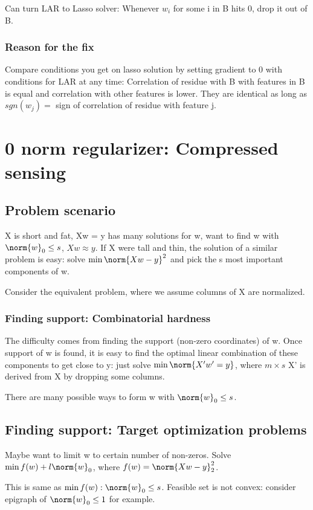 \documentclass[oneside, article]{memoir}
\begin{document}
Can turn LAR to Lasso solver: Whenever $w_{i}$ for some i in B hits 0, drop it out of B.

\subsubsection{Reason for the fix}
Compare conditions you get on lasso solution by setting gradient to 0 with conditions for LAR at any time: Correlation of residue with B with features in B is equal and correlation with other features is lower. They are identical as long as $sgn(w_j) = $ sign of correlation of residue with feature j.

\section{0 norm regularizer: Compressed sensing}
\subsection{Problem scenario}
X is short and fat, Xw = y has many solutions for w, want to find w with $\norm{w}_0\leq s$, $Xw \approx y$. If X were tall and thin, the solution of a similar problem is easy: solve $\min \norm{Xw - y}^{2}$ and pick the s most important components of w.

Consider the equivalent problem, where we assume columns of X are normalized.

\subsubsection{Finding support: Combinatorial hardness}
The difficulty comes from finding the support (non-zero coordinates) of w. Once support of w is found, it is easy to find the optimal linear combination of these components to get close to y: just solve $\min \norm{X'w' = y}$, where $m \times s$ X' is derived from X by dropping some columns.

There are many possible ways to form w with $\norm{w}_0\leq s$.

\subsection{Finding support: Target optimization problems}
Maybe want to limit w to certain number of non-zeros. Solve $\min f(w) + l \norm{w}_{0}$, where $f(w) = \norm{Xw - y}_2^{2}$.

This is same as $\min f(w): \norm{w}_{0} \leq s$. Feasible set is not convex: consider epigraph of $\norm{w}_0 \leq 1$ for example.
\end{document}
